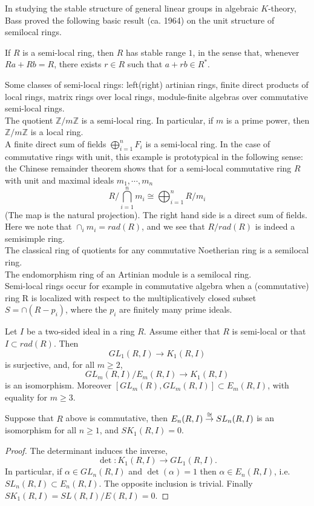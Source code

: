 In studying the stable structure of general linear groups in algebraic $K$-theory, Bass proved the following basic result (ca. 1964) on  the  unit
structure  of semilocal rings.
\begin{theorem}
	 If $R$ is a semi-local ring, then $R$ has stable range $1$,
in the sense that, whenever $Ra + Rb = R$, there exists $r \in R$ such that
$a + rb \in R^*$.
\end{theorem}
\begin{example}
Some classes of semi-local rings: left(right) artinian rings, finite direct products of local rings, matrix rings over local rings, module-finite algebras over commutative semi-local rings.\\
The quotient $\mathbb{Z}/m\mathbb{Z}$ is a semi-local ring. In particular, if $m$ is a prime power, then $\mathbb{Z}/m\mathbb{Z}$ is a local ring.\\
A finite direct sum of fields $\bigoplus_{i=1}^n{F_i}$ is a semi-local ring.
In the case of commutative rings with unit, this example is prototypical in the following sense: the Chinese remainder theorem shows that for a semi-local commutative ring $R$ with unit and maximal ideals $m_1, \cdots, m_n$
\[R/\bigcap_{i=1}^n m_i\cong\bigoplus_{i=1}^n R/m_i\]
(The map is the natural projection). The right hand side is a direct sum of fields. Here we note that $\cap_i m_i=rad(R)$, and we see that $R/rad(R)$ is indeed a semisimple ring.\\
The classical ring of quotients for any commutative Noetherian ring is a semilocal ring.\\
The endomorphism ring of an Artinian module is a semilocal ring.\\
Semi-local rings occur for example in commutative algebra when a (commutative) ring R is localized with respect to the multiplicatively closed subset $S = \cap (R - p_i)$, where the $p_i$ are finitely many prime ideals.
\end{example}

\begin{theorem}
	Let $I$ be a two-sided ideal in a ring $R$. Assume either that $R$ is semi-local or that $I\subset rad(R)$. Then 
	\[GL_1(R,I)\longrightarrow K_1(R,I)\]
	is surjective, and, for all $m\geq 2$,
	\[GL_m(R,I)/E_m(R,I)\longrightarrow K_1(R,I)\]
	is an isomorphism. Moreover $[GL_m(R),GL_m(R,I)]\subset E_m(R,I)$, with equality for $m\geq 3$.
\end{theorem}
\begin{corollary}
	Suppose that $R$ above is commutative, then $E_n(R,I)\overset{\cong}{\to} SL_n(R,I)$ is an isomorphism for all $n\geq 1$, and $SK_1(R,I)=0$.
\end{corollary}
\begin{proof}
	The determinant induces the inverse, 
	\[\det \colon K_1(R,I)\longrightarrow GL_1(R,I).\]
	In particular, if $\alpha\in GL_n(R,I)$ and $\det(\alpha)=1$ then $\alpha \in E_n(R,I)$, i.e. $SL_n(R,I)\subset E_n(R,I)$. The opposite inclusion is trivial. Finally $SK_1(R,I)=SL(R,I)/E(R,I)=0$.
\end{proof}


